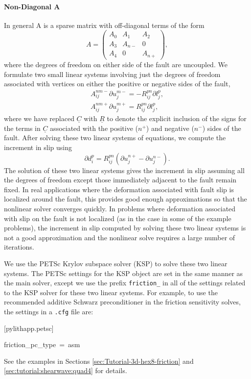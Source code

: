 \paragraph{Non-Diagonal A}

In general A is a sparse matrix with off-diagonal terms of the form
\begin{equation}
A=\left(\begin{array}{ccc}
A_{0} & A_{1} & A_{2}\\
A_{3} & A_{n-} & 0\\
A_{4} & 0 & A_{n+}
\end{array}\right),
\end{equation}
where the degrees of freedom on either side of the fault are uncoupled.
We formulate two small linear systems involving just the degrees of
freedom associated with vertices on either the positive or negative
sides of the fault,
\begin{gather}
A_{ij}^{nm-}\partial u_{j}^{m-}=-R_{ij}^{pn}\partial l_{j}^{p},\\
A_{ij}^{nm+}\partial u_{j}^{m+}=R_{ij}^{pn}\partial l_{j}^{p},
\end{gather}
where we have replaced $\underline{C}$ with $\underline{R}$ to denote
the explicit inclusion of the signs for the terms in $\underline{C}$
associated with the positive ($n^{+}$) and negative ($n^{-}$) sides
of the fault. After solving these two linear systems of equations,
we compute the increment in slip using
\begin{equation}
\partial d_{i}^{p}=R_{ij}^{pn}(\partial u_{j}^{n+}-\partial u_{j}^{n-}).
\end{equation}
The solution of these two linear systems gives the increment in slip
assuming all the degrees of freedom except those immediately adjacent
to the fault remain fixed. In real applications where the deformation
associated with fault slip is localized around the fault, this provides
good enough approximations so that the nonlinear solver converges
quickly. In problems where deformation associated with slip on the
fault is not localized (as in the case in some of the example problems),
the increment in slip computed by solving these two linear systems
is not a good approximation and the nonlinear solve requires a large
number of iterations.

We use the PETSc Krylov subspace solver (KSP) to solve these two linear
systems. The PETSc settings for the KSP object are set in the same
manner as the main solver, except we use the prefix \texttt{friction\_}
in all of the settings related to the KSP solver for these two linear
systems. For example, to use the recommended additive Schwarz preconditioner
in the friction sensitivity solves, the settings in a \texttt{.cfg}
file are:
\begin{lyxcode}
{[}pylithapp.petsc{]}

friction\_pc\_type~=~asm
\end{lyxcode}
See the examples in Sections \ref{sec:Tutorial-3d-hex8-friction}
and \ref{sec:tutorial:shearwave:quad4} for details.


